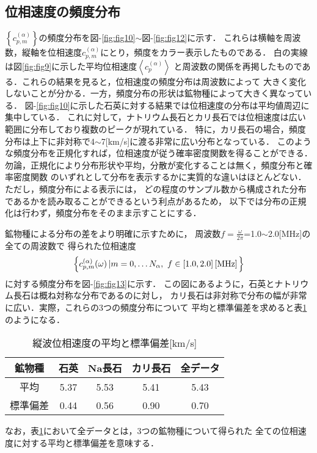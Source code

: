 \subsection{位相速度の頻度分布}
$\left\{ c^{(\alpha)}_{p,m}\right\}$の頻度分布を図-\ref{fig:fig10}$\sim$図-\ref{fig:fig12}に示す．
これらは横軸を周波数，縦軸を位相速度$c^{(\alpha)}_{p,m}$にとり，頻度をカラー表示したものである．
白の実線は図\ref{fig:fig9}に示した平均位相速度$\left<c^{(\alpha)}_p\right>$
と周波数の関係を再掲したものである．これらの結果を見ると，位相速度の頻度分布は周波数によって
大きく変化しないことが分かる．一方，頻度分布の形状は鉱物種によって大きく異なっている．
図-\ref{fig:fig10}に示した石英に対する結果では位相速度の分布は平均値周辺に集中している．
これに対して，ナトリウム長石とカリ長石では位相速度は広い範囲に分布しており複数のピークが現れている．
特に，カリ長石の場合，頻度分布は上下に非対称で4$\sim$7[km/s]に渡る非常に広い分布となっている．
このような頻度分布を正規化すれば，位相速度が従う確率密度関数を得ることができる．
勿論，正規化により分布形状や平均，分散が変化することは無く，頻度分布と確率密度関数
のいずれとして分布を表示するかに実質的な違いはほとんどない．ただし，頻度分布による表示には，
どの程度のサンプル数から構成された分布であるかを読み取ることができるという利点があるため，
以下では分布の正規化は行わず，頻度分布をそのまま示すことにする．


鉱物種による分布の差をより明確に示すために，
周波数$f=\frac{\omega}{2\pi}$=1.0$\sim$2.0[MHz]の全ての周波数で
得られた位相速度
\[
	\left\{ c_{p,m}^{(\alpha)}(\omega)\left| m=0,\dots N_\alpha ,\  f\in \left[ 1.0,2.0\right][{\rm MHz}] \right.\right\}
\]
に対する頻度分布を図-\ref{fig:fig13}に示す．
この図にあるように，石英とナトリウム長石は概ね対称な分布であるのに対し，
カリ長石は非対称で分布の幅が非常に広い．実際，これらの3つの頻度分布について
平均と標準偏差を求めると表\ref{tbl:tbl1}のようになる．
\begin{table}[htb]
	\caption{縦波位相速度の平均と標準偏差[km/s]}
  \begin{tabular}{c||c|c|c|c}
	  鉱物種 & 石英 & Na長石 & カリ長石 & 全データ\\
	  \hline
	  平均 & 5.37 & 5.53 & 5.41 & 5.43  \\
	  \hline
	  標準偏差 & 0.44 & 0.56 & 0.90 & 0.70  \\
  \end{tabular}
\label{tbl:tbl1}
\end{table}
なお，表\ref{tbl:tbl1}において全データとは，3つの鉱物種について得られた
全ての位相速度に対する平均と標準偏差を意味する．\\

